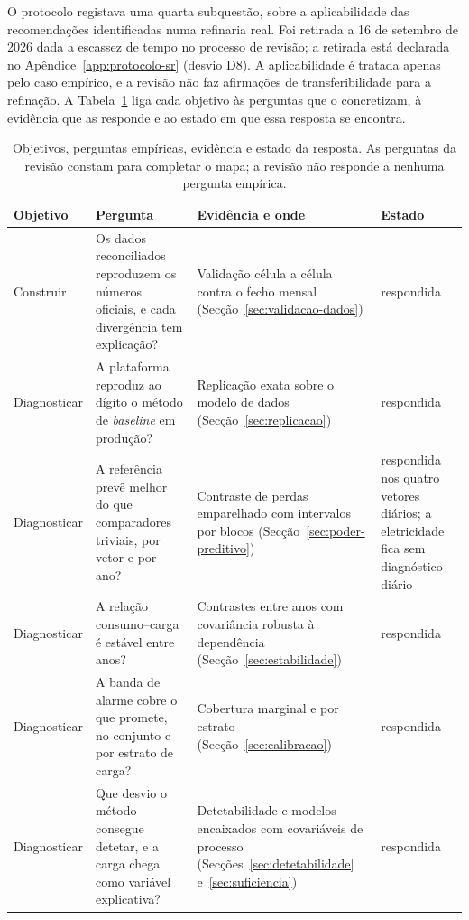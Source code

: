 O protocolo registava uma quarta subquestão, sobre a aplicabilidade das
recomendações identificadas numa refinaria real. Foi retirada a 16 de
setembro de 2026 dada a escassez de tempo no processo de revisão; a retirada está declarada no
Apêndice~\ref{app:protocolo-sr} (desvio D8). A aplicabilidade é tratada
apenas pelo caso empírico, e a revisão não faz afirmações de
transferibilidade para a refinação. A Tabela~\ref{tab:objetivos-perguntas}
liga cada objetivo às perguntas que o concretizam, à evidência que as
responde e ao estado em que essa resposta se encontra.

\begin{table}[htbp]
  \centering\small
  \caption{Objetivos, perguntas empíricas, evidência e estado da resposta.
  As perguntas da revisão constam para completar o mapa; a revisão não
  responde a nenhuma pergunta empírica.}
  \label{tab:objetivos-perguntas}
  \begin{tabularx}{\linewidth}{@{}>{\raggedright\arraybackslash}p{1.7cm}>{\raggedright\arraybackslash}X>{\raggedright\arraybackslash}X>{\raggedright\arraybackslash}p{3.1cm}@{}}
    \toprule
    Objetivo & Pergunta & Evidência e onde & Estado \\
    \midrule
    Construir & Os dados reconciliados reproduzem os números oficiais, e cada divergência tem explicação? & Validação célula a célula contra o fecho mensal (Secção~\ref{sec:validacao-dados}) & respondida \\
    \addlinespace
    Diagnosticar & A plataforma reproduz ao dígito o método de \emph{baseline} em produção? & Replicação exata sobre o modelo de dados (Secção~\ref{sec:replicacao}) & respondida \\
    Diagnosticar & A referência prevê melhor do que comparadores triviais, por vetor e por ano? & Contraste de perdas emparelhado com intervalos por blocos (Secção~\ref{sec:poder-preditivo}) & respondida nos quatro vetores diários; a eletricidade fica sem diagnóstico diário \\
    Diagnosticar & A relação consumo--carga é estável entre anos? & Contrastes entre anos com covariância robusta à dependência (Secção~\ref{sec:estabilidade}) & respondida \\
    Diagnosticar & A banda de alarme cobre o que promete, no conjunto e por estrato de carga? & Cobertura marginal e por estrato (Secção~\ref{sec:calibracao}) & respondida \\
    Diagnosticar & Que desvio o método consegue detetar, e a carga chega como variável explicativa? & Detetabilidade e modelos encaixados com covariáveis de processo (Secções~\ref{sec:detetabilidade} e~\ref{sec:suficiencia}) & respondida \\

\end{tabularx}
\end{table}
